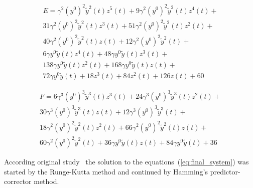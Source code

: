 \documentclass[12pt, letterpaper]{article}
\begin{document}
\begin{equation}
	\begin{aligned}
		E = \gamma^{2} \left(y^{0}\right)^{2} \tilde{y}^{2}{\left(t \right)} z^{5}{\left(t \right)} + 9 \gamma^{2} \left(y^{0}\right)^{2} \tilde{y}^{2}{\left(t \right)} z^{4}{\left(t \right)} + \\
		31 \gamma^{2} \left(y^{0}\right)^{2} \tilde{y}^{2}{\left(t \right)} z^{3}{\left(t \right)} + 51 \gamma^{2} \left(y^{0}\right)^{2} \tilde{y}^{2}{\left(t \right)} z^{2}{\left(t \right)} + \\
		40 \gamma^{2} \left(y^{0}\right)^{2} \tilde{y}^{2}{\left(t \right)} z{\left(t \right)} + 12 \gamma^{2} \left(y^{0}\right)^{2} \tilde{y}^{2}{\left(t \right)} + \\
		6 \gamma y^{0} \tilde{y}{\left(t \right)} z^{4}{\left(t \right)} + 48 \gamma y^{0} \tilde{y}{\left(t \right)} z^{3}{\left(t \right)} + \\
		138 \gamma y^{0} \tilde{y}{\left(t \right)} z^{2}{\left(t \right)} + 168 \gamma y^{0} \tilde{y}{\left(t \right)} z{\left(t \right)} + \\
		72 \gamma y^{0} \tilde{y}{\left(t \right)} + 18 z^{3}{\left(t \right)} + 84 z^{2}{\left(t \right)} + 126 z{\left(t \right)} + 60
	\end{aligned}
\end{equation}

\begin{equation}
	\begin{aligned}
		F = 6 \gamma^{3} \left(y^{0}\right)^{3} \tilde{y}^{3}{\left(t \right)} z^{3}{\left(t \right)} + 24 \gamma^{3} \left(y^{0}\right)^{3} \tilde{y}^{3}{\left(t \right)} z^{2}{\left(t \right)} + \\
		30 \gamma^{3} \left(y^{0}\right)^{3} \tilde{y}^{3}{\left(t \right)} z{\left(t \right)} + 12 \gamma^{3} \left(y^{0}\right)^{3} \tilde{y}^{3}{\left(t \right)} + \\
		18 \gamma^{2} \left(y^{0}\right)^{2} \tilde{y}^{2}{\left(t \right)} z^{2}{\left(t \right)} + 66 \gamma^{2} \left(y^{0}\right)^{2} \tilde{y}^{2}{\left(t \right)} z{\left(t \right)} + \\
		60 \gamma^{2} \left(y^{0}\right)^{2} \tilde{y}^{2}{\left(t \right)} + 36 \gamma y^{0} \tilde{y}{\left(t \right)} z{\left(t \right)} + 84 \gamma y^{0} \tilde{y}{\left(t \right)} + 36
	\end{aligned}
\end{equation}

According original study~\cite{Boyd_3} the solution to the equations~(\ref{eq:final_system}) was started by the Runge-Kutta method and continued by Hamming's predictor-corrector method.


\printbibliography
\end{document}
